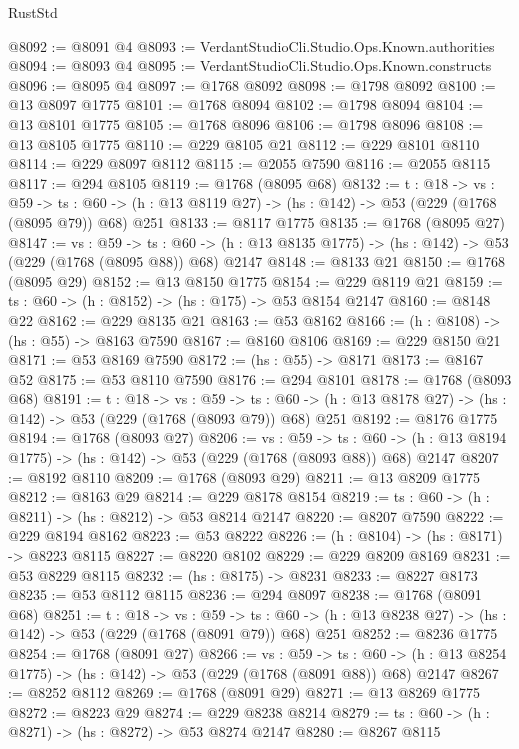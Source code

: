 \begin{lexlean}{RustStd}
\begin{coremodule}
@8092 := @8091 @4
@8093 := VerdantStudioCli.Studio.Ops.Known.authorities
@8094 := @8093 @4
@8095 := VerdantStudioCli.Studio.Ops.Known.constructs
@8096 := @8095 @4
@8097 := @1768 @8092
@8098 := @1798 @8092
@8100 := @13 @8097 @1775
@8101 := @1768 @8094
@8102 := @1798 @8094
@8104 := @13 @8101 @1775
@8105 := @1768 @8096
@8106 := @1798 @8096
@8108 := @13 @8105 @1775
@8110 := @229 @8105 @21
@8112 := @229 @8101 @8110
@8114 := @229 @8097 @8112
@8115 := @2055 @7590
@8116 := @2055 @8115
@8117 := @294 @8105
@8119 := @1768 (@8095 @68)
@8132 := {t : @18} ->
  {vs : @59} ->
  {ts : @60} -> (h : @13 @8119 @27) -> (hs : @142) -> @53 (@229 (@1768 (@8095 @79)) @68) @251
@8133 := @8117 @1775
@8135 := @1768 (@8095 @27)
@8147 := {vs : @59} ->
  {ts : @60} -> (h : @13 @8135 @1775) -> (hs : @142) -> @53 (@229 (@1768 (@8095 @88)) @68) @2147
@8148 := @8133 @21
@8150 := @1768 (@8095 @29)
@8152 := @13 @8150 @1775
@8154 := @229 @8119 @21
@8159 := {ts : @60} -> (h : @8152) -> (hs : @175) -> @53 @8154 @2147
@8160 := @8148 @22
@8162 := @229 @8135 @21
@8163 := @53 @8162
@8166 := (h : @8108) -> (hs : @55) -> @8163 @7590
@8167 := @8160 @8106
@8169 := @229 @8150 @21
@8171 := @53 @8169 @7590
@8172 := (hs : @55) -> @8171
@8173 := @8167 @52
@8175 := @53 @8110 @7590
@8176 := @294 @8101
@8178 := @1768 (@8093 @68)
@8191 := {t : @18} ->
  {vs : @59} ->
  {ts : @60} -> (h : @13 @8178 @27) -> (hs : @142) -> @53 (@229 (@1768 (@8093 @79)) @68) @251
@8192 := @8176 @1775
@8194 := @1768 (@8093 @27)
@8206 := {vs : @59} ->
  {ts : @60} -> (h : @13 @8194 @1775) -> (hs : @142) -> @53 (@229 (@1768 (@8093 @88)) @68) @2147
@8207 := @8192 @8110
@8209 := @1768 (@8093 @29)
@8211 := @13 @8209 @1775
@8212 := @8163 @29
@8214 := @229 @8178 @8154
@8219 := {ts : @60} -> (h : @8211) -> (hs : @8212) -> @53 @8214 @2147
@8220 := @8207 @7590
@8222 := @229 @8194 @8162
@8223 := @53 @8222
@8226 := (h : @8104) -> (hs : @8171) -> @8223 @8115
@8227 := @8220 @8102
@8229 := @229 @8209 @8169
@8231 := @53 @8229 @8115
@8232 := (hs : @8175) -> @8231
@8233 := @8227 @8173
@8235 := @53 @8112 @8115
@8236 := @294 @8097
@8238 := @1768 (@8091 @68)
@8251 := {t : @18} ->
  {vs : @59} ->
  {ts : @60} -> (h : @13 @8238 @27) -> (hs : @142) -> @53 (@229 (@1768 (@8091 @79)) @68) @251
@8252 := @8236 @1775
@8254 := @1768 (@8091 @27)
@8266 := {vs : @59} ->
  {ts : @60} -> (h : @13 @8254 @1775) -> (hs : @142) -> @53 (@229 (@1768 (@8091 @88)) @68) @2147
@8267 := @8252 @8112
@8269 := @1768 (@8091 @29)
@8271 := @13 @8269 @1775
@8272 := @8223 @29
@8274 := @229 @8238 @8214
@8279 := {ts : @60} -> (h : @8271) -> (hs : @8272) -> @53 @8274 @2147
@8280 := @8267 @8115

\end{coremodule}
\end{lexlean}
